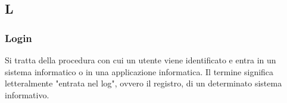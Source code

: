 \subsection{L}

\subsubsection{Login}
Si tratta della procedura con cui un utente viene identificato e entra in un 
sistema informatico o in una applicazione informatica.
Il termine significa letteralmente "entrata nel log", ovvero il registro, di un 
determinato sistema informativo.

\newpage
